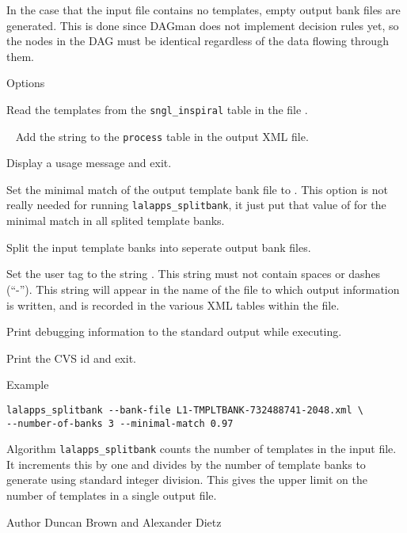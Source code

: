 \begin{entry}
In the case that the input file contains no templates, empty output bank files
are generated. This is done since DAGman does not implement decision rules
yet, so the nodes in the DAG must be identical regardless of the data flowing
through them.

\item[Options]\leavevmode
\begin{entry}

\item[\option{--bank-file} \parm{file}] 
Read the templates from the \texttt{sngl\_inspiral} table in the file .

\item[ \option{--comment}~\parm{comment}]
Add the string  to the \verb$process$ table in the output XML file.

\item[\option{--help}]
Display a usage message and exit.

\item[\option{--minimal-match} \parm{m}] 
Set the minimal match of the output template bank file to .
This option is not really needed for running \verb$lalapps_splitbank$, it just put that value of  for the minimal match in all splited template banks.

\item[\option{--number-of-banks} \parm{n}] 
 Split the input template banks into  seperate output bank files.

\item[\option{--user-tag} \parm{comment}]
Set the user tag to the string .  This string must not
contain spaces or dashes (``-'').  This string will appear in the name of
the file to which output information is written, and is recorded in the
various XML tables within the file.

\item[\option{--verbose}]
Print debugging information to the
standard output while executing.

\item[\option{--version}]   
Print the CVS id and exit.

\end{entry}

\item[Example]
\begin{verbatim}
lalapps_splitbank --bank-file L1-TMPLTBANK-732488741-2048.xml \
--number-of-banks 3 --minimal-match 0.97
\end{verbatim}

\item[Algorithm]
\texttt{lalapps\_splitbank} counts the number of templates in the input file.
It increments this by one and divides by the number of template banks to
generate using standard integer division. This gives the upper limit on the
number of templates in a single output file.

\item[Author] 
Duncan Brown and Alexander Dietz
\end{entry}

